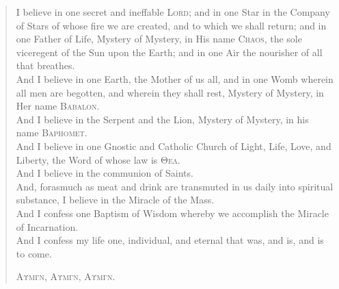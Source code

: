 
\begin{verse}
  I believe in one secret and ineffable \textsc{Lord}; and in one Star in the Company of Stars of whose fire we are created, and to which we shall return; and in one Father of Life, Mystery of Mystery, in His name \textsc{Chaos}, the sole viceregent of the Sun upon the Earth; and in one Air the nourisher of all that breathes. \\

  And I believe in one Earth, the Mother of us all, and in one Womb wherein all men are begotten, and wherein they shall rest, Mystery of Mystery, in Her name \textsc{Babalon}. \\

  And I believe in the Serpent and the Lion, Mystery of Mystery, in his name \textsc{Baphomet}. \\

  And I believe in one Gnostic and Catholic Church of Light, Life, Love, and Liberty, the Word of whose law is \textsc{\textgreek{Θελ}}. \\

  And I believe in the communion of Saints. \\

  And, forasmuch as meat and drink are transmuted in us daily into spiritual substance, I believe in the Miracle of the Mass. \\

  And I confess one Baptism of Wisdom whereby we accomplish the Miracle of Incarnation. \\

  And I confess my life one, individual, and eternal that was, and is, and is to come. \\

  {\centering \textsc{\textgreek{Αυμγν}, \textgreek{Αυμγν}, \textgreek{Αυμγν}.} \par}
\end{verse}
